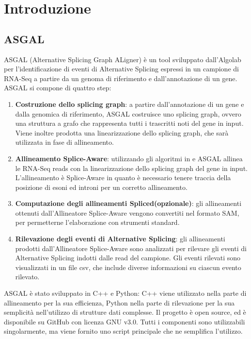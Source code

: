 \section{Introduzione}
\subsection{ASGAL}
ASGAL (Alternative Splicing Graph ALigner) \cite{denti2018asgal} è un tool sviluppato dall'Algolab per l'identificazione di eventi di Alternative Splicing espressi in un campione di RNA-Seq a partire da un genoma di riferimento e dall'annotazione di un gene. ASGAL si compone di quattro step:

\begin{enumerate}
	\item \textbf{Costruzione dello splicing graph}: a partire dall'annotazione di un gene e dalla genomica di riferimento, ASGAL costruisce uno splicing graph, ovvero una struttura a grafo che rappresenta tutti i trascritti noti del gene in input. Viene inoltre prodotta una linearizzazione dello splicing graph, che sarà utilizzata in fase di allineamento.
	\item \textbf{Allineamento Splice-Aware}: utilizzando gli algoritmi in \cite{beretta2017mapping} e \cite{ohlebusch2010computing} ASGAL allinea le RNA-Seq reads con la linearizzazione dello splicing graph del gene in input. L'allineamento è Splice-Aware in quanto è necessario tenere traccia della posizione di esoni ed introni per un corretto allineamento.
	\item \textbf{Computazione degli allineamenti Spliced(opzionale)}: gli allineamenti ottenuti dall'Allineatore Splice-Aware vengono convertiti nel formato SAM, per permetterne l'elaborazione con strumenti standard.
	\item \textbf{Rilevazione degli eventi di Alternative Splicing}: gli allineamenti prodotti dall'Allineatore Splice-Aware sono analizzati per rilevare gli eventi di Alternative Splicing indotti dalle read del campione. Gli eventi rilevati sono visualizzati in un file csv, che include diverse informazioni su ciascun evento rilevato.
\end{enumerate}

ASGAL è stato sviluppato in C++ e Python: C++ viene utilizzato nella parte di allineamento per la sua efficienza, Python nella parte di rilevazione per la sua semplicità nell'utilizzo di strutture dati complesse. Il progetto è open source, ed è disponibile su GitHub con licenza GNU v3.0. Tutti i componenti sono utilizzabili singolarmente, ma viene fornito uno script principale che ne semplifica l'utilizzo.  

